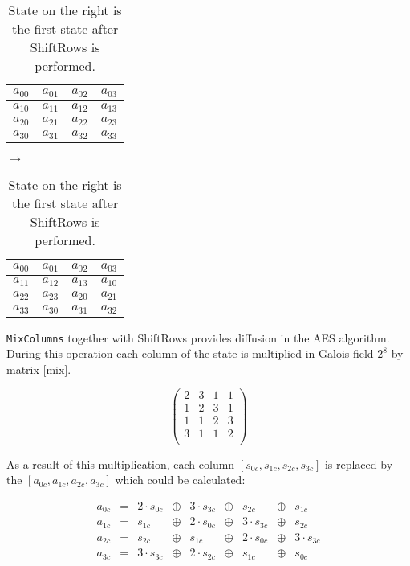 \begin{table}[H]
\label{shift}
\begin{center}
\begin{tabular}{|c|c|c|c|}\hline%
 $a_{00}$ & $a_{01}$ & $a_{02}$ & $a_{03}$  \\\hline
 $a_{10}$ & $a_{11}$ & $a_{12}$ & $a_{13}$  \\\hline
 $a_{20}$ & $a_{21}$ & $a_{22}$ & $a_{23}$  \\\hline
 $a_{30}$ & $a_{31}$ & $a_{32}$ & $a_{33}$  \\\hline
\end{tabular}
$\longrightarrow$
\begin{tabular}{|c|c|c|c|}\hline%
 $a_{00}$ & $a_{01}$ & $a_{02}$ & $a_{03}$  \\\hline
 $a_{11}$ & $a_{12}$ & $a_{13}$ & $a_{10}$  \\\hline
 $a_{22}$ & $a_{23}$ & $a_{20}$ & $a_{21}$  \\\hline
 $a_{33}$ & $a_{30}$ & $a_{31}$ & $a_{32}$  \\\hline
\end{tabular}
\end{center}
\caption{State on the right is the first state after ShiftRows is performed.}
\end{table}

\hspace{-1.5em}\texttt{MixColumns} together with ShiftRows provides diffusion in
the AES algorithm. During this operation each column of the state is multiplied 
in Galois field $2^8$ by matrix \ref{mix}.

\begin{equation}
\label{mix}
\left(
\begin{array}{cccc}%
 2 & 3 & 1 & 1  \\
 1 & 2 & 3 & 1  \\
 1 & 1 & 2 & 3  \\
 3 & 1 & 1 & 2  \\
\end{array}
\right)
\end{equation}

As a result of this multiplication, each column $[s_{0c}, s_{1c}, s_{2c}, 
s_{3c}]$ is replaced by the $[a_{0c}, a_{1c}, a_{2c}, a_{3c}]$ which could be 
calculated:

\begin{equation}
\begin{array}{lllllllll}
a_{0c} &=& 2\cdot s_{0c} &\oplus& 3\cdot s_{3c} &\oplus& s_{2c} &\oplus& s_{1c} \\
a_{1c} &=& s_{1c} &\oplus& 2\cdot s_{0c} &\oplus& 3\cdot s_{3c} &\oplus& s_{2c} \\
a_{2c} &=& s_{2c} &\oplus& s_{1c} &\oplus& 2\cdot s_{0c} &\oplus& 3\cdot s_{3c} \\
a_{3c} &=& 3\cdot s_{3c} &\oplus& 2\cdot s_{2c} &\oplus& s_{1c} &\oplus& s_{0c}
\end{array}
\end{equation}


